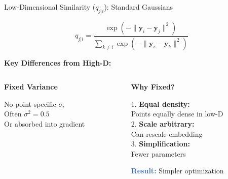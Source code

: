 \documentclass{beamer}
\begin{document}
\begin{frame}{Low-Dimensional Similarity ($q_{j|i}$): Standard Gaussians}
\vspace{-0.3cm}

\begin{center}
\colorbox{upcblue!10}{
\begin{minipage}{0.85\textwidth}
\centering
$$q_{j|i} = \frac{\exp(-\|\mathbf{y}_i - \mathbf{y}_j\|^2)}{\sum_{k \neq i} \exp(-\|\mathbf{y}_i - \mathbf{y}_k\|^2)}$$
\end{minipage}
}
\end{center}

\vspace{0.2cm}
\textbf{\color{upcblue}Key Differences from High-D:}

\begin{columns}[T]
\begin{column}{0.48\textwidth}
\textbf{Fixed Variance}

\begin{center}
\end{center}

\footnotesize
No point-specific $\sigma_i$\\
Often $\sigma^2 = 0.5$\\
Or absorbed into gradient
\end{column}

\begin{column}{0.48\textwidth}
\textbf{Why Fixed?}

\footnotesize
1. \textbf{Equal density:}\\
   Points equally dense in low-D\\
2. \textbf{Scale arbitrary:}\\
   Can rescale embedding\\
3. \textbf{Simplification:}\\
   Fewer parameters

\vspace{0.2cm}
\textcolor{highlight}{\textbf{Result:}} Simpler optimization
\end{column}
\end{columns}


\end{frame}
\end{document}
